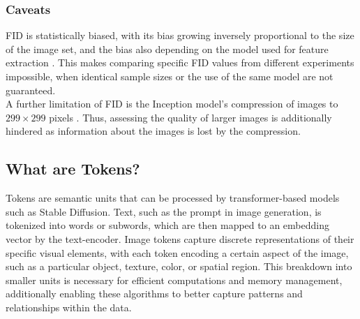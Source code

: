 \subsubsection{Caveats}
FID is statistically biased, with its bias growing inversely proportional to the size of the image set, and the bias also depending on the model used for feature extraction \cite{Chong_2020_CVPR}. This makes comparing specific FID values from different experiments impossible, when identical sample sizes or the use of the same model are not guaranteed.\\
A further limitation of FID is the Inception model's compression of images to $299 \times 299$ pixels \cite{szegedy2016rethinking}. Thus, assessing the quality of larger images is additionally hindered as information about the images is lost by the compression.



\subsection{What are Tokens?}
Tokens are semantic units that can be processed by transformer-based models such as Stable Diffusion. Text, such as the prompt in image generation, is tokenized into words or subwords, which are then mapped to an embedding vector by the text-encoder. Image tokens capture discrete representations of their specific visual elements, with each token encoding a certain aspect of the image, such as a particular object, texture, color, or spatial region. This breakdown into smaller units is necessary for efficient computations and memory management, additionally enabling these algorithms to better capture patterns and relationships within the data.
